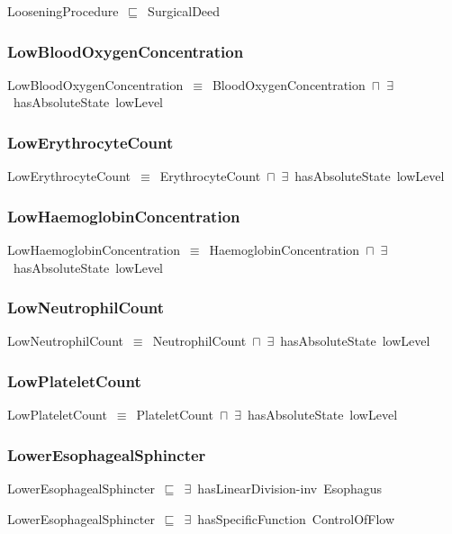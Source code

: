 \documentclass{article}
\begin{document}
LooseningProcedure~\ensuremath{\sqsubseteq}~SurgicalDeed~

\subsubsection*{LowBloodOxygenConcentration}

LowBloodOxygenConcentration~\ensuremath{\equiv}~BloodOxygenConcentration~\ensuremath{\sqcap}~\ensuremath{\exists}~hasAbsoluteState~lowLevel

\subsubsection*{LowErythrocyteCount}

LowErythrocyteCount~\ensuremath{\equiv}~ErythrocyteCount~\ensuremath{\sqcap}~\ensuremath{\exists}~hasAbsoluteState~lowLevel

\subsubsection*{LowHaemoglobinConcentration}

LowHaemoglobinConcentration~\ensuremath{\equiv}~HaemoglobinConcentration~\ensuremath{\sqcap}~\ensuremath{\exists}~hasAbsoluteState~lowLevel

\subsubsection*{LowNeutrophilCount}

LowNeutrophilCount~\ensuremath{\equiv}~NeutrophilCount~\ensuremath{\sqcap}~\ensuremath{\exists}~hasAbsoluteState~lowLevel

\subsubsection*{LowPlateletCount}

LowPlateletCount~\ensuremath{\equiv}~PlateletCount~\ensuremath{\sqcap}~\ensuremath{\exists}~hasAbsoluteState~lowLevel

\subsubsection*{LowerEsophagealSphincter}

LowerEsophagealSphincter~\ensuremath{\sqsubseteq}~\ensuremath{\exists}~hasLinearDivision-inv~Esophagus~

LowerEsophagealSphincter~\ensuremath{\sqsubseteq}~\ensuremath{\exists}~hasSpecificFunction~ControlOfFlow~
\end{document}
